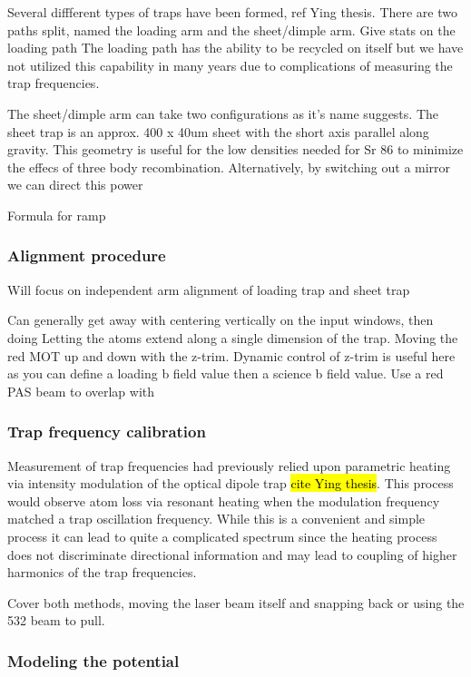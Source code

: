 Several diffferent types of traps have been formed, ref Ying thesis. There are two paths split, named the loading arm and the sheet/dimple arm. Give stats on the loading path The loading path has the ability to be recycled on itself but we have not utilized this capability in many years due to complications of measuring the trap frequencies. 

The sheet/dimple arm can take two configurations as it's name suggests. The sheet trap is an approx. 400 x 40um sheet with the short axis parallel along gravity. This geometry is useful for the low densities needed for Sr 86 to minimize the effecs of three body recombination. Alternatively, by switching out a mirror we can direct this power

Formula for ramp

\subsubsection{Alignment procedure} \label{sssec:1064_align}

Will focus on independent arm alignment of loading trap and sheet trap


Can generally get away with centering vertically on the input windows, then doing 
Letting the atoms extend along a single dimension of the trap. 
Moving the red MOT up and down with the z-trim. Dynamic control of z-trim is useful here as you can define a loading b field value then a science b field value.
Use a red PAS beam to overlap with


\subsubsection{Trap frequency calibration} \label{sssec:1064_trap_freq}

Measurement of trap frequencies had previously relied upon parametric heating via intensity modulation of the optical dipole trap \hl{cite Ying thesis}. This process would observe atom loss via resonant heating when the modulation frequency matched a trap oscillation frequency. While this is a convenient and simple process it can lead to quite a complicated spectrum since the heating process does not discriminate directional information and may lead to coupling of higher harmonics of the trap frequencies. 

Cover both methods, moving the laser beam itself and snapping back or using the 532 beam to pull.

\subsubsection{Modeling the potential} \label{sssec:1064_modeling}

